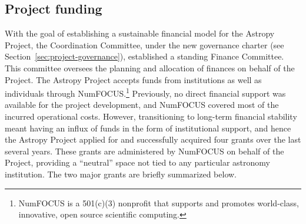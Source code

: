 \documentclass[modern]{aastex631}
\newcommand{\secauthor}[1]{{\color{blue}Author:~\textit{#1}}}
\begin{document}


\subsection{Project funding} \label{sec:project-funding}



With the goal of establishing a sustainable financial model for the Astropy
Project, the Coordination Committee, under the new governance charter (see
Section~\ref{sec:project-governance}), established a standing Finance Committee.
This committee oversees the planning and allocation of finances on behalf
of the Project. The Astropy Project accepts funds from institutions as well as
individuals through NumFOCUS.\footnote{NumFOCUS is a 501(c)(3) nonprofit that
supports and promotes world-class, innovative, open source scientific computing.}
Previously, no direct financial support was available for the project development,
and NumFOCUS covered most of the incurred operational costs. However, transitioning
to long-term financial stability meant having an influx of funds in the form of
institutional support, and hence the Astropy Project applied for and successfully
acquired four grants over the last several years. These grants are administered by NumFOCUS on behalf of the
Project, providing a ``neutral'' space not tied to any particular astronomy
institution. The two major grants are briefly summarized below.
\end{document}

